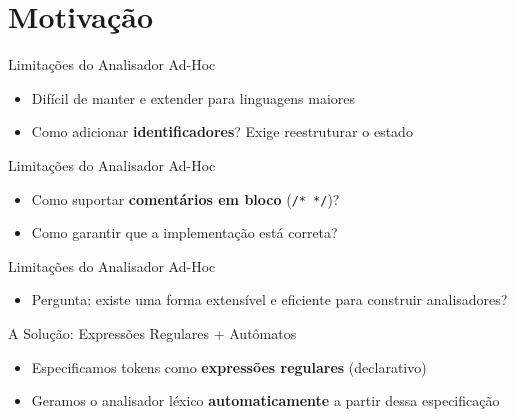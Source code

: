 \subtitle{\bf Aula 3 - Motivação}
\begin{frame}[t,plain]
    \titlepage
\end{frame}


\section{Motivação}\label{motivauxe7uxe3o}

\begin{frame}{Limitações do Analisador Ad-Hoc}

    \begin{itemize}

        \item
        Difícil de manter e extender para linguagens maiores
        \item
        Como adicionar \textbf{identificadores}? Exige reestruturar o estado
    \end{itemize}
\end{frame}

\begin{frame}[fragile]{Limitações do Analisador Ad-Hoc}

    \begin{itemize}

        \item
        Como suportar \textbf{comentários em bloco}
        (\texttt{/* */})?
        \item
        Como garantir que a implementação está correta?
    \end{itemize}
\end{frame}

\begin{frame}{Limitações do Analisador Ad-Hoc}

    \begin{itemize}

        \item
        Pergunta: existe uma forma extensível e eficiente para construir
        analisadores?
    \end{itemize}
\end{frame}

\begin{frame}{A Solução: Expressões Regulares + Autômatos}

    \begin{itemize}

        \item
        Especificamos tokens como \textbf{expressões regulares} (declarativo)
        \item
        Geramos o analisador léxico \textbf{automaticamente} a partir dessa
        especificação
    \end{itemize}
\end{frame}

